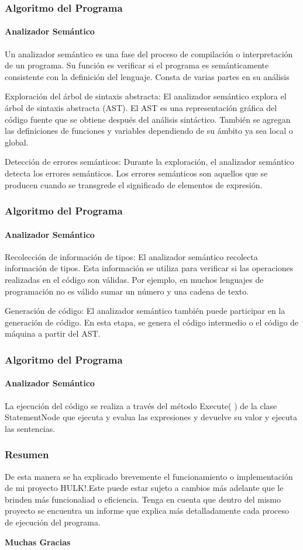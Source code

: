 \documentclass{beamer}
\begin{document}
\begin{frame}
\frametitle{Algoritmo del Programa}
\framesubtitle{Analizador Semántico}
Un analizador semántico es una fase del proceso de compilación o interpretación de un programa. Su función es verificar si el programa es semánticamente consistente con la definición del lenguaje. Consta de varias partes en su análisis

Exploración del árbol de sintaxis abstracta: El analizador semántico explora el árbol de sintaxis abstracta (AST). El AST es una representación gráfica del código fuente que se obtiene después del análisis sintáctico. También se agregan las definiciones de funciones y variables dependiendo de su ámbito ya sea local o global.

Detección de errores semánticos: Durante la exploración, el analizador semántico detecta los errores semánticos. Los errores semánticos son aquellos que se producen cuando se transgrede el significado de elementos de expresión.

\end{frame}

\begin{frame}
\frametitle{Algoritmo del Programa}
\framesubtitle{Analizador Semántico}
Recolección de información de tipos: El analizador semántico recolecta información de tipos. Esta información se utiliza para verificar si las operaciones realizadas en el código son válidas. Por ejemplo, en muchos lenguajes de programación no es válido sumar un número y una cadena de texto.

Generación de código: El analizador semántico también puede participar en la generación de código. En esta etapa, se genera el código intermedio o el código de máquina a partir del AST.

\end{frame}


\begin{frame}
    \frametitle{Algoritmo del Programa}
    \framesubtitle{Analizador Semántico}
    
    La ejecución del código se realiza a través del método Execute( ) de la clase StatementNode que ejecuta y evalua las expresiones y devuelve su valor y ejecuta las sentencias. 
    
    \end{frame}
    


\begin{frame}
  \frametitle{Resumen}
  De esta manera se ha explicado brevemente el funcionamiento o implementación de mi proyecto HULK!.Este puede estar sujeto a cambios más adelante que le brinden más funcionaliad o eficiencia. Tenga en cuenta que dentro del mismo proyecto se encuentra un informe que explica más detalladamente cada proceso de ejecución del programa.
\end{frame}
\maketitle
\begin{frame}
\center
\Huge\textbf{Muchas Gracias}
\end{frame}
\end{document}

